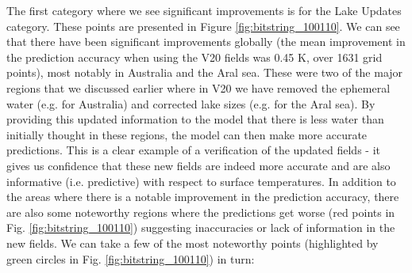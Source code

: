 \documentclass[twocolumn]{article}
\begin{document}
\noindent The first category where we see significant improvements is for the Lake Updates category. These points are presented in Figure \ref{fig:bitstring_100110}.  We can see that there have been significant improvements globally (the mean improvement in the prediction accuracy when using the V20 fields was 0.45 K, over 1631 grid points), most notably in Australia and the Aral sea. These were two of the major regions that we discussed earlier where in V20 we have removed the ephemeral water (e.g. for Australia) and corrected lake sizes (e.g. for the Aral sea). By providing this updated information to the model that there is less water than initially thought in these regions, the model can then make more accurate predictions. This is a clear example of a verification of the updated fields - it gives us confidence that these new fields are indeed more accurate and are also informative (i.e. predictive) with respect to surface temperatures. In addition to the areas where there is a notable improvement in the prediction accuracy, there are also some noteworthy regions where the predictions get worse (red points in Fig. \ref{fig:bitstring_100110}) suggesting inaccuracies or lack of information in the new fields. We can take a few of the most noteworthy points (highlighted by green circles in Fig. \ref{fig:bitstring_100110}) in turn:
\end{document}

